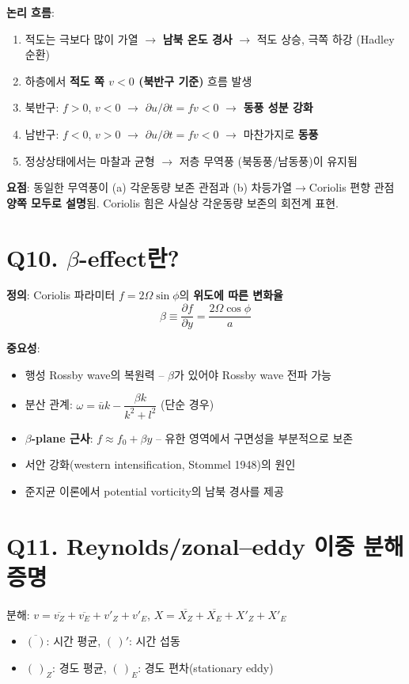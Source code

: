 \documentclass[11pt,a4paper]{article}
\begin{document}
\textbf{논리 흐름}:
\begin{enumerate}
    \item 적도는 극보다 많이 가열 $\to$ \textbf{남북 온도 경사} $\to$ 적도 상승, 극쪽 하강 (Hadley 순환)
    \item 하층에서 \textbf{적도 쪽 $v<0$ (북반구 기준)} 흐름 발생
    \item 북반구: $f>0$, $v<0$ $\to$ $\partial u/\partial t = fv < 0$ $\to$ \textbf{동풍 성분 강화}
    \item 남반구: $f<0$, $v>0$ $\to$ $\partial u/\partial t = fv < 0$ $\to$ 마찬가지로 \textbf{동풍}
    \item 정상상태에서는 마찰과 균형 $\to$ 저층 무역풍 (북동풍/남동풍)이 유지됨
\end{enumerate}

\textbf{요점}: 동일한 무역풍이 (a) 각운동량 보존 관점과 (b) 차등가열$\to$Coriolis 편향 관점 \textbf{양쪽 모두로 설명}됨. Coriolis 힘은 사실상 각운동량 보존의 회전계 표현.

\section*{Q10. $\beta$-effect란?}

\textbf{정의}: Coriolis 파라미터 $f=2\Omega\sin\phi$의 \textbf{위도에 따른 변화율}
$$\beta \equiv \frac{\partial f}{\partial y} = \frac{2\Omega\cos\phi}{a}$$

\textbf{중요성}:
\begin{itemize}
    \item 행성 Rossby wave의 복원력 -- $\beta$가 있어야 Rossby wave 전파 가능
    \item 분산 관계: $\omega = \bar{u}k - \dfrac{\beta k}{k^2+l^2}$ (단순 경우)
    \item \textbf{$\beta$-plane 근사}: $f \approx f_0 + \beta y$ -- 유한 영역에서 구면성을 부분적으로 보존
    \item 서안 강화(western intensification, Stommel 1948)의 원인
    \item 준지균 이론에서 potential vorticity의 남북 경사를 제공
\end{itemize}

\section*{Q11. Reynolds/zonal--eddy 이중 분해 증명}

분해: $v = \overline{v_Z} + \overline{v_E} + v'_Z + v'_E$, $X = \overline{X_Z} + \overline{X_E} + X'_Z + X'_E$
\begin{itemize}
    \item $\overline{(\,)}$: 시간 평균, $(\,)'$: 시간 섭동
    \item $(\,)_Z$: 경도 평균, $(\,)_E$: 경도 편차(stationary eddy)
\end{itemize}
\end{document}
